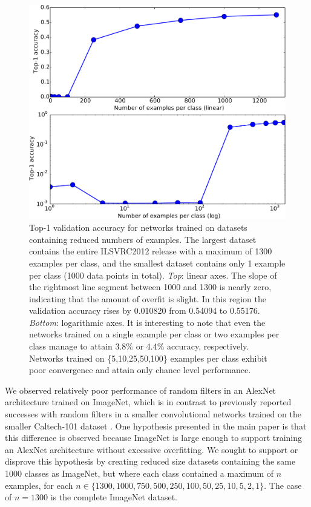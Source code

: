 \begin{figure}[th]
\begin{center}
\includegraphics[width=1.0\linewidth]{plots/result_reduced_crop.pdf}
\end{center}
\caption{Top-1 validation accuracy for networks trained on datasets containing reduced numbers of examples. The largest dataset contains the entire ILSVRC2012 \citep{imagenet_cvpr09} release with a maximum of 1300 examples per class, and the smallest dataset contains only 1 example per class (1000 data points in total). \emph{Top}: linear axes. The slope of the rightmost line segment between 1000 and 1300 is nearly zero, indicating that the amount of overfit is slight. In this region the validation accuracy rises by 0.010820 from 0.54094 to 0.55176. \emph{Bottom}: logarithmic axes. It is interesting to note that even the networks trained on a single example per class or two examples per class manage to attain 3.8\% or 4.4\% accuracy, respectively. Networks trained on \{5,10,25,50,100\} examples per class exhibit poor convergence and attain only chance level performance.}
\end{figure}

We observed relatively poor
performance of random filters in an AlexNet
architecture \citep{Krizhevsky-2012} trained on ImageNet, which is in contrast to previously reported successes with random
filters in a smaller convolutional networks
trained on the smaller Caltech-101 dataset \citep{Jarrett-ICCV2009}.
One hypothesis presented in the main paper is that this difference is observed because ImageNet is large
enough to support training an AlexNet architecture without excessive overfitting.
We sought to support or disprove this hypothesis by creating reduced
size datasets containing the same 1000 classes as ImageNet, but where
each class contained a maximum of $n$ examples, for each $n \in \{1300 ,1000 ,750
,500 ,250 ,100 ,50 ,25 ,10 ,5 ,2 ,1\}$. The case of $n = 1300$ is the
complete ImageNet dataset.

